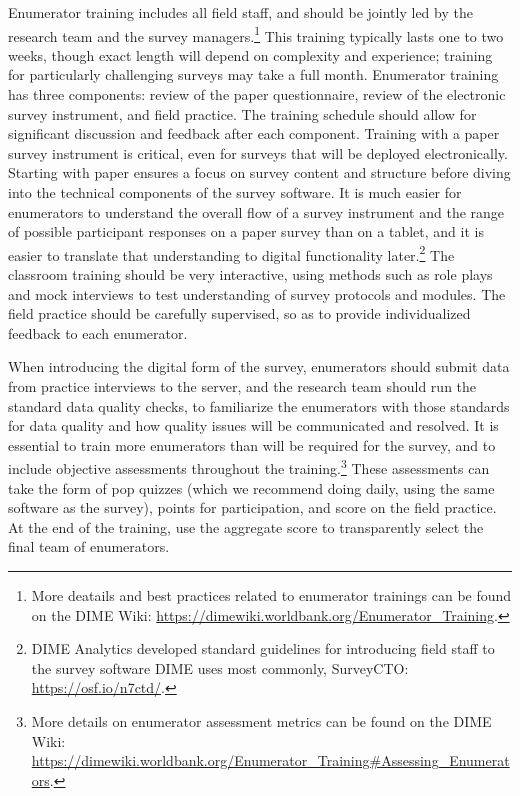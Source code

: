 \documentclass[
]{book}
\begin{document}
Enumerator training includes all field staff,
and should be jointly led by the research team
and the survey managers.\footnote{More deatails and best practices related to enumerator trainings
  can be found on the DIME Wiki:
  \url{https://dimewiki.worldbank.org/Enumerator_Training}.}
This training typically lasts one to two weeks,
though exact length will depend on complexity and experience;
training for particularly challenging surveys may take a full month.
Enumerator training has three components: review of the paper questionnaire,
review of the electronic survey instrument, and field practice.
The training schedule should allow for significant discussion and feedback
after each component.
Training with a paper survey instrument is critical,
even for surveys that will be deployed electronically.
Starting with paper ensures a focus on survey content and structure
before diving into the technical components of the survey software.
It is much easier for enumerators to understand
the overall flow of a survey instrument and
the range of possible participant responses
on a paper survey than on a tablet,
and it is easier to translate that understanding to
digital functionality later.\footnote{DIME Analytics developed standard guidelines
  for introducing field staff to the survey software DIME
  uses most commonly, SurveyCTO:
  \url{https://osf.io/n7ctd/}.}
The classroom training should be very interactive, using methods such as role plays
and mock interviews to test understanding of survey protocols and modules.
The field practice should be carefully supervised,
so as to provide individualized feedback to each enumerator.

When introducing the digital form of the survey,
enumerators should submit data from practice interviews to the server,
and the research team should run the standard data quality checks,
to familiarize the enumerators with those standards for data quality
and how quality issues will be communicated and resolved.
It is essential to train more enumerators than will be required
for the survey,
and to include objective assessments throughout the training.\footnote{More details on enumerator assessment metrics
  can be found on the DIME Wiki:
  \url{https://dimewiki.worldbank.org/Enumerator_Training\#Assessing_Enumerators}.}
These assessments can take the form of pop quizzes (which we recommend doing daily,
using the same software as the survey), points for participation,
and score on the field practice.
At the end of the training, use the aggregate score to transparently select the final team of enumerators.
\end{document}
